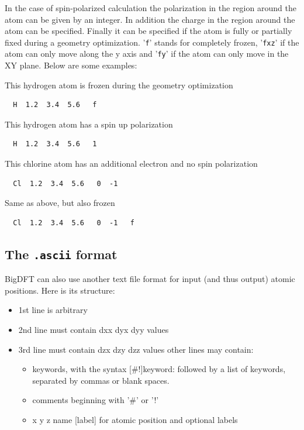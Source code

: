 \documentclass[a4paper,11pt]{report}
\begin{document}
In the case of spin-polarized calculation the polarization in the region around the atom can 
be given by an integer. In addition the charge in the region around the atom can be specified.
Finally it can be specified if the atom is fully or partially fixed during a geometry optimization.
'\texttt{f}' stands for completely frozen, '\texttt{fxz}' if the atom can only move along the y axis and '\texttt{fy}' if the atom 
can only move in the XY plane. Below are some examples:

This hydrogen atom is frozen during the geometry optimization
\begin{verbatim}
  H  1.2  3.4  5.6   f
\end{verbatim}

This hydrogen atom has a spin up polarization
\begin{verbatim}
  H  1.2  3.4  5.6   1
\end{verbatim}

This chlorine atom has an additional electron and no spin polarization
\begin{verbatim}
  Cl  1.2  3.4  5.6   0  -1
\end{verbatim}

Same as above, but also frozen
\begin{verbatim}
  Cl  1.2  3.4  5.6   0  -1   f
\end{verbatim}

\subsection{The \texttt{.ascii} format}
BigDFT can also use another text file format for input (and thus output) atomic positions. Here is its structure:

\begin{itemize}
  \item 1st line is arbitrary
  \item 2nd line must contain dxx dyx dyy values
  \item 3rd line must contain dzx dzy dzz values other lines may contain: 
  \begin{itemize}
    \item keywords, with the syntax [\#!]keyword: followed by a list of keywords, separated by commas or blank spaces.
    \item comments beginning with '\#' or '!'
    \item x y z name [label] for atomic position and optional labels
  \end{itemize}
\end{itemize}
\end{document}
